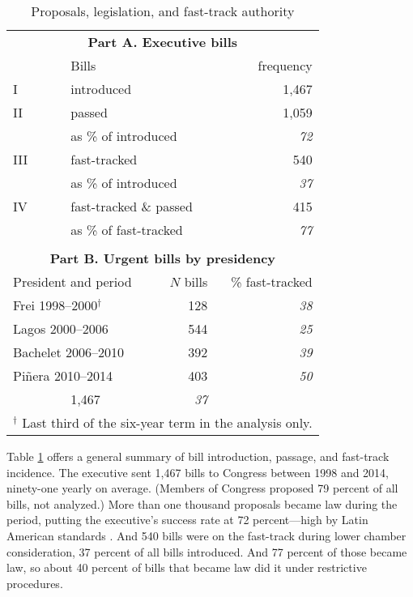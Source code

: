 \documentclass[letter,12pt]{article}
\begin{document}
\begin{table}
\centering
\caption{Proposals, legislation, and fast-track authority}\label{T:billDescriptives}
\begin{tabular}{llrr}
\multicolumn{4}{c}{\textbf{Part A. Executive bills}} \\
   & \multicolumn{2}{l}{Bills}                           &   frequency  \\ \hline
I  & \multicolumn{2}{l}{introduced}                      &       1,467  \\ \hdashline
II & \multicolumn{2}{l}{passed}                          &       1,059  \\
   & \multicolumn{2}{l}{as \% of introduced}             &   \emph{72}  \\ \hdashline
III& \multicolumn{2}{l}{fast-tracked}                    &         540  \\
   & \multicolumn{2}{l}{as \% of introduced}             &   \emph{37}  \\ \hdashline
IV & \multicolumn{2}{l}{fast-tracked \& passed}          &         415  \\
   & \multicolumn{2}{l}{as \% of fast-tracked}           &   \emph{77}  \\ \hline
\\
\multicolumn{4}{c}{\textbf{Part B. Urgent bills by presidency}} \\
\multicolumn{2}{l}{President and period}    & $N$ bills & \% fast-tracked \\ \hline
\multicolumn{2}{l}{Frei 1998--2000$^\dagger$} & 128       &  \emph{38} \\
\multicolumn{2}{l}{Lagos 2000--2006}        & 544       &  \emph{25} \\
\multicolumn{2}{l}{Bachelet 2006--2010}     & 392       &  \emph{39} \\
\multicolumn{2}{l}{Piñera 2010--2014}       & 403       &  \emph{50} \\ \hdashline
\multicolumn{2}{l}{All 1998--2014}          & 1,467     &  \emph{37} \\
\hline
\multicolumn{4}{r}{\footnotesize{$^\dagger$ Last third of the six-year term in the analysis only.}} \\
\end{tabular}
\end{table}

Table \ref{T:billDescriptives} offers a general summary of bill introduction, passage, and fast-track incidence. The executive sent 1,467 bills to Congress between 1998 and 2014, ninety-one yearly on average. (Members of Congress proposed 79 percent of all bills, not analyzed.) More than one thousand proposals became law during the period, putting the executive's success rate at 72 percent---high by Latin American standards \citep{morgenstern.nacif.2002}. And 540 bills were on the fast-track during lower chamber consideration, 37 percent of all bills introduced. And 77 percent of those became law, so about 40 percent of bills that became law did it under restrictive procedures. 
\end{document}

